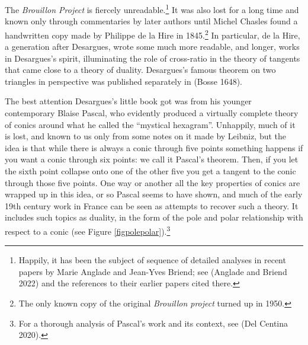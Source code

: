 \bigskip 
{}




The  \emph{Brouillon Project} is fiercely unreadable.\footnote{Happily, it has been the subject of sequence of detailed analyses in recent papers by Marie  Anglade and Jean-Yves Briend; see (Anglade and Briend 2022) and the references to their earlier papers cited there.} It was also lost for a long time and known only through commentaries by later authors until Michel Chasles found a handwritten copy made by Philippe de la Hire in 1845.\footnote{The only known copy of the original \emph{Brouillon project} turned up in 1950.} In particular, de la Hire, a generation after Desargues, wrote some much more readable, and longer, works in Desargues's spirit, illuminating the role of cross-ratio in the theory of tangents that came close to a theory of duality. Desargues's famous theorem on two triangles in perspective was published separately in (Bosse 1648).

The best attention Desargues's little book got was from his younger contemporary Blaise Pascal, who evidently produced a virtually complete theory of conics around what he called the ``mystical hexagram''. Unhappily, much of it is lost, and known to us only from some notes on it made by Leibniz, but the idea is that while there is always a conic through five points something happens if you want a conic through six points: we call it Pascal's theorem. Then, if you let the sixth point collapse onto one of the other five you get a tangent to the conic through those five points. One way or another all the key properties of conics are wrapped up in this idea, or so Pascal seems to have shown, and much of the early 19th century work in France can be seen as attempts to recover such a theory. It includes such topics as duality, in the form of the pole and polar relationship with respect to a conic (see Figure \ref{figpolepolar}).\footnote{For a thorough analysis of Pascal's work and its context, see (Del Centina 2020).} 



